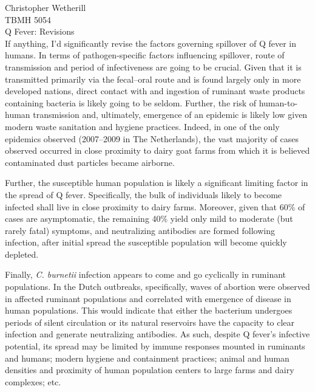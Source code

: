 \documentclass[11pt,letterpaper,final] {article}
\begin{document}
\newpage

\noindent Christopher Wetherill \\
TBMH 5054 \\
Q Fever: Revisions \\[0.2cm]

If anything, I'd significantly revise the factors governing spillover of Q fever in humans. In terms of pathogen-specific factors influencing spillover, route of transmission and period of infectiveness are going to be crucial. Given that it is transmitted primarily via the fecal--oral route and is found largely only in more developed nations, direct contact with and ingestion of ruminant waste products containing bacteria is likely going to be seldom. Further, the risk of human-to-human transmission and, ultimately, emergence of an epidemic is likely low given modern waste sanitation and hygiene practices. Indeed, in one of the only epidemics observed (2007--2009 in The Netherlands), the vast majority of cases observed occurred in close proximity to dairy goat farms from which it is believed contaminated dust particles became airborne.

Further, the susceptible human population is likely a significant limiting factor in the spread of Q fever. Specifically, the bulk of individuals likely to become infected shall live in close proximity to dairy farms. Moreover, given that 60\% of cases are asymptomatic, the remaining 40\% yield only mild to moderate (but rarely fatal) symptoms, and neutralizing antibodies are formed following infection, after initial spread the susceptible population will become quickly depleted.

Finally, \textit{C. burnetii} infection appears to come and go cyclically in ruminant populations. In the Dutch outbreaks, specifically, waves of abortion were observed in affected ruminant populations and correlated with emergence of disease in human populations. This would indicate that either the bacterium undergoes periods of silent circulation or its natural reservoirs have the capacity to clear infection and generate neutralizing antibodies. As such, despite Q fever's infective potential, its spread may be limited by immune responses mounted in ruminants and humans; modern hygiene and containment practices; animal and human densities and proximity of human population centers to large farms and dairy complexes; etc.


\clearpage


\nocite{*}
\end{document}
